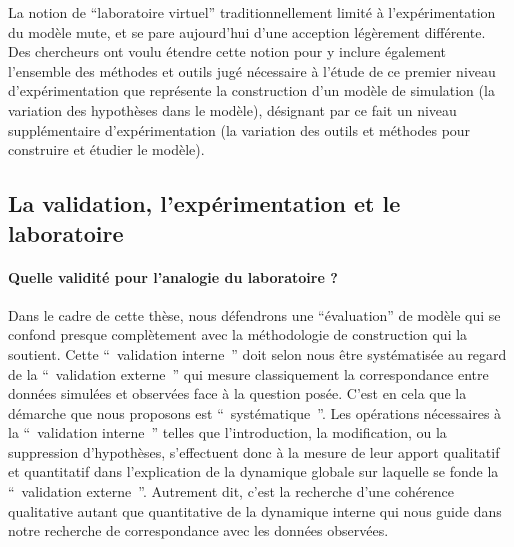 La notion de \enquote{laboratoire virtuel} traditionnellement limité à l'expérimentation du modèle mute, et se pare aujourd'hui d'une acception légèrement différente. Des chercheurs \autocite{Schmitt2014} \autocite{Amblard2003} ont voulu étendre cette notion pour y inclure également l'ensemble des méthodes et outils jugé nécessaire à l'étude de ce premier niveau d'expérimentation que représente la construction d'un modèle de simulation (la variation des hypothèses dans le modèle), désignant par ce fait un niveau supplémentaire d’expérimentation (la variation des outils et méthodes pour construire et étudier le modèle).



\subsection{La validation, l'expérimentation et le laboratoire}

\paragraph{Quelle validité pour l'analogie du laboratoire ?}

Dans le cadre de cette thèse, nous défendrons une \enquote{évaluation} de modèle qui se confond presque complètement avec la méthodologie de construction qui la soutient. Cette \enquote{ validation interne } doit selon nous être systématisée au regard de la \enquote{ validation externe } qui mesure classiquement la correspondance entre données simulées et observées face à la question posée. C’est en cela que la démarche que nous proposons est \enquote{ systématique }. Les opérations nécessaires à la \enquote{ validation interne } telles que l'introduction, la modification, ou la suppression d'hypothèses, s’effectuent donc à la mesure de leur apport qualitatif et quantitatif dans l'explication de la dynamique globale sur laquelle se fonde la \enquote{ validation externe }. Autrement dit, c'est la recherche d'une cohérence qualitative autant que quantitative de la dynamique interne qui nous guide dans notre recherche de correspondance avec les données observées.


